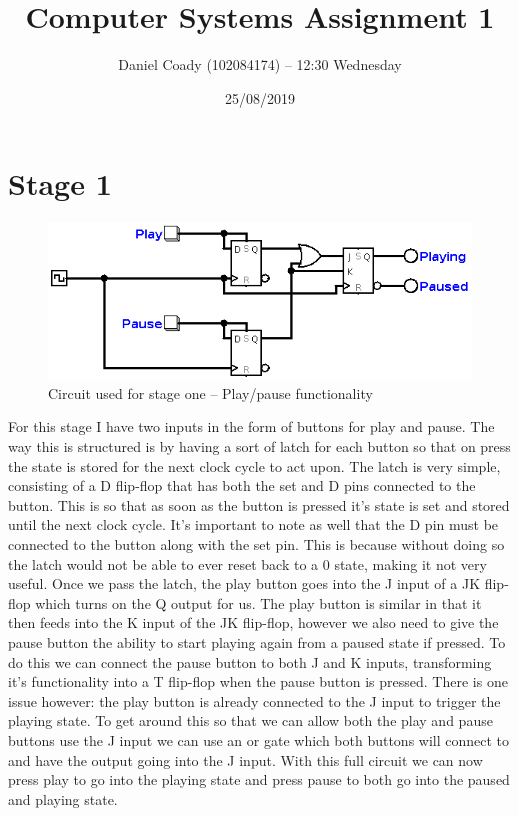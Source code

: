 \documentclass[11pt]{scrartcl}
\title{Computer Systems Assignment 1}
\author{Daniel Coady (102084174) -- 12:30 Wednesday}
\date{25/08/2019}
\begin{document}
\maketitle

\pagebreak

\section*{Stage 1}
\begin{figure}[h]
    \centering
    \includegraphics[scale=0.5]{images/stageone.png}
    \caption{Circuit used for stage one -- Play/pause functionality}
\end{figure}
For this stage I have two inputs in the form of buttons for play and pause. The way this is
structured is by having a sort of latch for each button so that on press the state is stored
for the next clock cycle to act upon. The latch is very simple, consisting of a D flip-flop
that has both the set and D pins connected to the button. This is so that as soon as the
button is pressed it's state is set and stored until the next clock cycle. It's important
to note as well that the D pin must be connected to the button along with the set pin.
This is because without doing so the latch would not be able to ever reset back to a 0 state,
making it not very useful. Once we pass the latch, the play button goes into the J input of a
JK flip-flop which turns on the Q output for us. The play button is similar in that it then
feeds into the K input of the JK flip-flop, however we also need to give the pause button the
ability to start playing again from a paused state if pressed. To do this we can connect the
pause button to both J and K inputs, transforming it's functionality into a T flip-flop when
the pause button is pressed. There is one issue however: the play button is already connected
to the J input to trigger the playing state. To get around this so that we can allow both the
play and pause buttons use the J input we can use an or gate which both buttons will connect
to and have the output going into the J input. With this full circuit we can now press play
to go into the playing state and press pause to both go into the paused and playing state.
\end{document}
